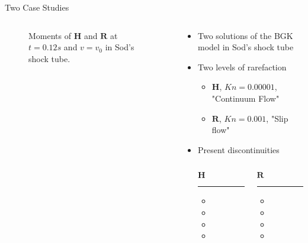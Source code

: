\documentclass[usenames,dvipsnames,Nike,mathserif]{tuberlinbeamer}
\begin{document}
\begin{frame}[fragile]{Two Case Studies}
	\begin{columns}
		\begin{column}{.5\textwidth}
			\begin{figure}
				
				\caption{Moments of $\mathbf{H}$ and $\mathbf{R}$ at $t=0.12s$ and $v=v_0$ in Sod's shock tube.}
			\end{figure}
		\end{column}
		\begin{column}{.5\textwidth}
			\begin{itemize}
				\item Two solutions of the BGK model in Sod's shock tube
				\item Two levels of rarefaction
				\begin{itemize}
					\item $\mathbf{H}$, $Kn=0.00001$, "Continuum Flow"
					\item $\mathbf{R}$, $Kn=0.001$, "Slip flow"
				\end{itemize}
				\item Present discontinuities
			\begin{columns}
				\begin{column}{.3\textwidth}
					$\mathbf{H}$
					\hrule
					\begin{itemize}
						\item {}
						\item {}
						\item {}
						\item {}
					\end{itemize}
				\end{column}
				\begin{column}{.3\textwidth}
					$\mathbf{R}$
					\hrule
					\begin{itemize}
						\item {}
						\item {}
						\item {}
						\item {}
					\end{itemize}
				\end{column}
			\end{columns}
			\end{itemize}
		\end{column}
	\end{columns}
\end{frame}
\end{document}
